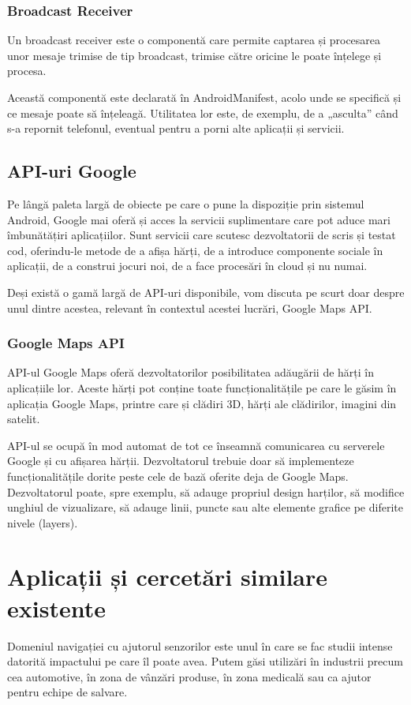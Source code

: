 \documentclass[12pt,a4paper]{article}
\begin{document}
\subsubsection{Broadcast Receiver}
Un broadcast receiver este o componentă care permite captarea și procesarea unor mesaje trimise de tip broadcast, trimise către oricine le poate înțelege și procesa.

Această componentă este declarată în AndroidManifest, acolo unde se specifică și ce mesaje poate să înțeleagă. Utilitatea lor este, de exemplu, de a „asculta” când s-a repornit telefonul, eventual pentru a porni alte aplicații și servicii.


\subsection{API-uri Google}
Pe lângă paleta largă de obiecte pe care o pune la dispoziție prin sistemul Android, Google mai oferă și acces la servicii suplimentare care pot aduce mari îmbunătățiri aplicațiilor. Sunt servicii care scutesc dezvoltatorii de scris și testat cod, oferindu-le metode de a afișa hărți, de a introduce componente sociale în aplicații, de a construi jocuri noi, de a face procesări în cloud și nu numai.

Deși există o gamă largă de API-uri disponibile, vom discuta pe scurt doar despre unul dintre acestea, relevant în contextul acestei lucrări, Google Maps API.

\subsubsection{Google Maps API \cite{GoogleMapsAndroidAPI}}
API-ul Google Maps oferă dezvoltatorilor posibilitatea adăugării de hărți în aplicațiile lor. Aceste hărți pot conține toate funcționalitățile pe care le găsim în aplicația Google Maps, printre care și clădiri 3D, hărți ale clădirilor, imagini din satelit.

API-ul se ocupă în mod automat de tot ce înseamnă comunicarea cu serverele Google și cu afișarea hărții. Dezvoltatorul trebuie doar să implementeze funcționalitățile dorite peste cele de bază oferite deja de Google Maps. Dezvoltatorul poate, spre exemplu, să adauge propriul design harților, să modifice unghiul de vizualizare, să adauge linii, puncte sau alte elemente grafice pe diferite nivele (layers).


\newpage
\section{Aplicații și cercetări similare existente}
Domeniul navigației cu ajutorul senzorilor este unul în care se fac studii intense datorită impactului pe care îl poate avea. Putem găsi utilizări în industrii precum cea automotive, în zona de vânzări produse, în zona medicală sau ca ajutor pentru echipe de salvare.
\end{document}

